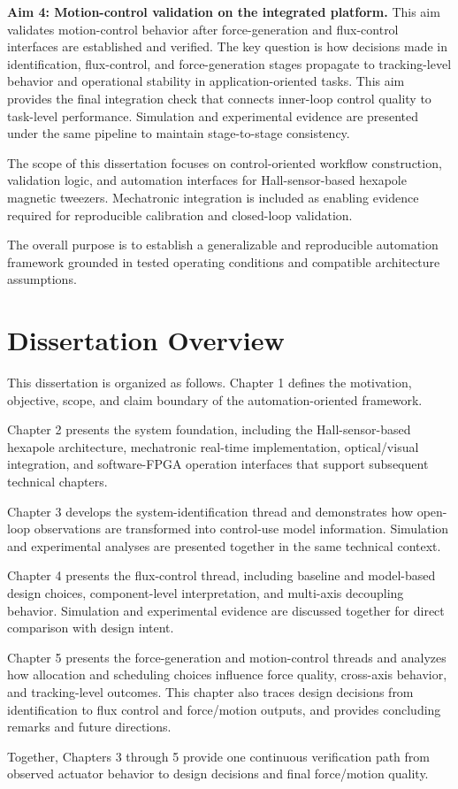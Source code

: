 \textbf{Aim 4: Motion-control validation on the integrated platform.}
This aim validates motion-control behavior after force-generation and flux-control interfaces are established and verified. The key question is how decisions made in identification, flux-control, and force-generation stages propagate to tracking-level behavior and operational stability in application-oriented tasks. This aim provides the final integration check that connects inner-loop control quality to task-level performance. Simulation and experimental evidence are presented under the same pipeline to maintain stage-to-stage consistency.

The scope of this dissertation focuses on control-oriented workflow construction, validation logic, and automation interfaces for Hall-sensor-based hexapole magnetic tweezers. Mechatronic integration is included as enabling evidence required for reproducible calibration and closed-loop validation.

The overall purpose is to establish a generalizable and reproducible automation framework grounded in tested operating conditions and compatible architecture assumptions.

\section{Dissertation Overview}

This dissertation is organized as follows. Chapter 1 defines the motivation, objective, scope, and claim boundary of the automation-oriented framework.

Chapter 2 presents the system foundation, including the Hall-sensor-based hexapole architecture, mechatronic real-time implementation, optical/visual integration, and software-FPGA operation interfaces that support subsequent technical chapters.

Chapter 3 develops the system-identification thread and demonstrates how open-loop observations are transformed into control-use model information. Simulation and experimental analyses are presented together in the same technical context.

Chapter 4 presents the flux-control thread, including baseline and model-based design choices, component-level interpretation, and multi-axis decoupling behavior. Simulation and experimental evidence are discussed together for direct comparison with design intent.

Chapter 5 presents the force-generation and motion-control threads and analyzes how allocation and scheduling choices influence force quality, cross-axis behavior, and tracking-level outcomes. This chapter also traces design decisions from identification to flux control and force/motion outputs, and provides concluding remarks and future directions.

Together, Chapters 3 through 5 provide one continuous verification path from observed actuator behavior to design decisions and final force/motion quality.

